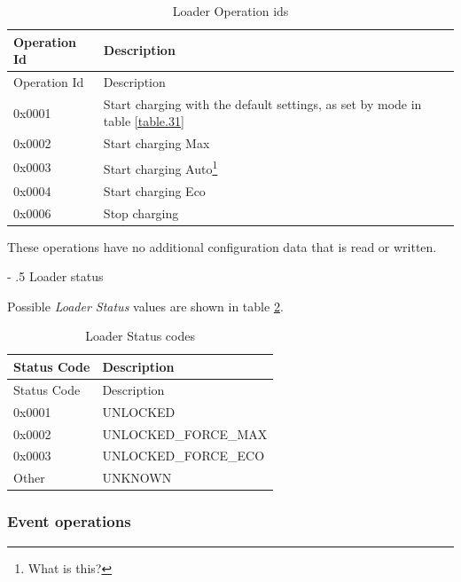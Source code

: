 \documentclass[a4paper]{article}
\makeatletter
\renewcommand\paragraph{%
   \@startsection{paragraph}{4}{0mm}%
      {-\baselineskip}%
      {.5\baselineskip}%
      {\normalfont\normalsize\bfseries}}
\makeatother
\begin{document}
\begin{longtable}[]{@{}ll@{}}
	\caption{Loader Operation ids}
	\label{table.12}
	\tabularnewline
	\toprule\noalign{}
	Operation Id & Description                                                 \\
	\midrule\noalign{}
	\endfirsthead
	\toprule\noalign{}
	Operation Id & Description                                                 \\
	\midrule\noalign{}
	\endhead
	\bottomrule\noalign{}
	\endlastfoot
	0x0001       & Start charging with the default settings, as set by mode in 
	table \ref{table.31} \\
	0x0002       & Start charging Max                                          \\
	0x0003       & Start charging Auto\footnote{What is this?}                 \\
	0x0004       & Start charging Eco                                          \\
	0x0006       & Stop charging                                               \\
\end{longtable}

These operations have no additional configuration data that is read or
written.

\paragraph{Loader status}
\label{loader_status}

Possible \emph{Loader Status} values are shown in table \ref{table.13}.

\begin{longtable}[]{@{}ll@{}}
	\caption{Loader Status codes}
	\label{table.13}
	\tabularnewline
	\toprule\noalign{}
	Status Code & Description          \\
	\midrule\noalign{}
	\endfirsthead
	\toprule\noalign{}
	Status Code & Description          \\
	\midrule\noalign{}
	\endhead
	\bottomrule\noalign{}
	\endlastfoot
	0x0001      & UNLOCKED             \\
	0x0002      & UNLOCKED\_FORCE\_MAX \\
	0x0003      & UNLOCKED\_FORCE\_ECO \\
	Other       & UNKNOWN              \\
\end{longtable}

\subsubsection{Event operations}
\label{event_operations}
\end{document}
